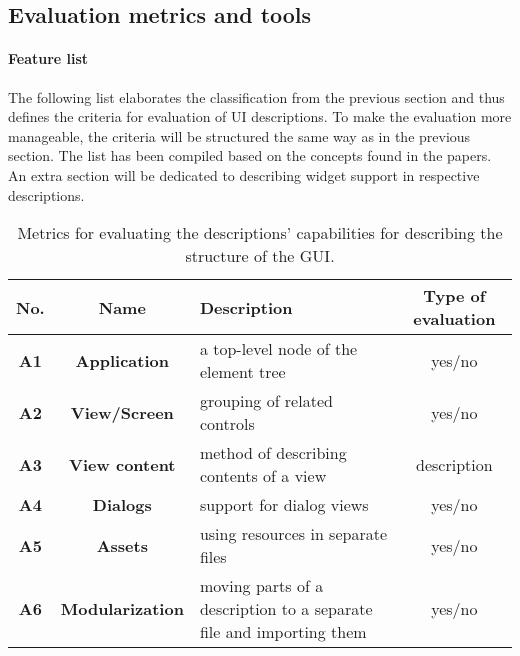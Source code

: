 \subsection{Evaluation metrics and tools}\label{subsec:evaluation-metrics-and-tools}

\paragraph{Feature list}
The following list elaborates the classification from the previous section and thus defines the criteria for evaluation of UI descriptions.
To make the evaluation more manageable, the criteria will be structured the same way as in the previous section.
The list has been compiled based on the concepts found in the papers.
An extra section will be dedicated to describing widget support in respective descriptions.



\begin{table}[]
    \centering
    \caption{Metrics for evaluating the descriptions' capabilities for describing the structure of the GUI.}
    \label{tab:evaluation-metrics-structure}
    \renewcommand{\tabularxcolumn}[1]{>{\normalsize}m{#1}}
    \begin{tabularx}{\textwidth}{ccCc}
        \toprule
        \textbf{No.} & \textbf{Name}           & \textbf{Description}                                                & \textbf{Type of evaluation} \\
        \midrule
        \textbf{A1}  & \textbf{Application}    & a top-level node of the element tree                                & yes/no                      \\
        \textbf{A2}  & \textbf{View/Screen}    & grouping of related controls                                        & yes/no                      \\
        \textbf{A3}  & \textbf{View content}   & method of describing contents of a view                             & description                 \\
        \textbf{A4}  & \textbf{Dialogs}        & support for dialog views                                            & yes/no                      \\
        \textbf{A5}  & \textbf{Assets}         & using resources in separate files                                   & yes/no                      \\
        \textbf{A6}  & \textbf{Modularization} & moving parts of a description to a separate file and importing them & yes/no                      \\
        \bottomrule
    \end{tabularx}
\end{table}

